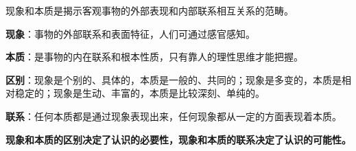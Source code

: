现象和本质是揭示客观事物的外部表现和内部联系相互关系的范畴。

{\textbf{现象}}：事物的外部联系和表面特征，人们可通过感官感知。

\textbf{{本质}}：是事物的内在联系和根本性质，只有靠人的理性思维才能把握。

{\textbf{区别}}：现象是个别的、具体的，本质是一般的、共同的；现象是多变的，本质是相对稳定的；现象是生动、丰富的，本质是比较深刻、单纯的。

\textbf{{联系}}：任何本质都是通过现象表现出来，任何现象都从一定的方面表现着本质。

\textbf{现象和本质的区别决定了认识的必要性，现象和本质的联系决定了认识的可能性。}
